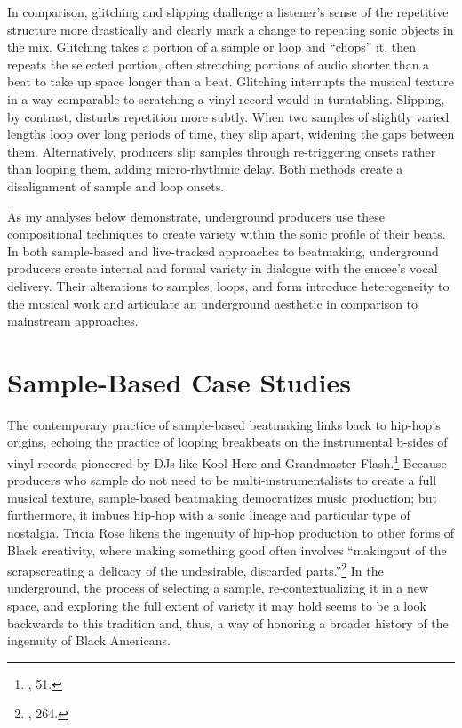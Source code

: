 In comparison, glitching and slipping challenge a listener's sense of the repetitive structure more drastically and clearly mark a change to repeating sonic objects in the mix. Glitching takes a portion of a sample or loop and ``chops'' it, then repeats the selected portion, often stretching portions of audio shorter than a beat to take up space longer than a beat. Glitching interrupts the musical texture in a way comparable to scratching a vinyl record would in turntabling. Slipping, by contrast, disturbs repetition more subtly. When two samples of slightly varied lengths loop over long periods of time, they slip apart, widening the gaps between them. Alternatively, producers slip samples through re-triggering onsets rather than looping them, adding micro-rhythmic delay. Both methods create a disalignment of sample and loop onsets.

As my analyses below demonstrate, underground producers use these compositional techniques to create variety within the sonic profile of their beats. In both sample-based and live-tracked approaches to beatmaking, underground producers create internal and formal variety in dialogue with the emcee's vocal delivery. Their alterations to samples, loops, and form introduce heterogeneity to the musical work and articulate an underground aesthetic in comparison to mainstream approaches.
\section{Sample-Based Case Studies}
The contemporary practice of sample-based beatmaking links back to hip-hop's origins, echoing the practice of looping breakbeats on the instrumental b-sides of vinyl records pioneered by DJs like Kool Herc and Grandmaster Flash.\footnote{\cite{triciaroseBlackNoiseRap1994}, 51.} Because producers who sample do not need to be multi-instrumentalists to create a full musical texture, sample-based beatmaking democratizes music production; but furthermore, it imbues hip-hop with a sonic lineage and particular type of nostalgia. Tricia Rose likens the ingenuity of hip-hop production to other forms of Black creativity, where making something good often involves ``making\textellipsis out of the scraps\textemdash creating a delicacy of the undesirable, discarded parts.''\footnote{\cite{triciaroseHipHopWarsWhat2008}, 264.} In the underground, the process of selecting a sample, re-contextualizing it in a new space, and exploring the full extent of variety it may hold seems to be a look backwards to this tradition and, thus, a way of honoring a broader history of the ingenuity of Black Americans.

